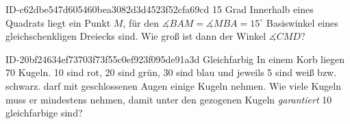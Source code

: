 \begin{exercise}
      {ID-c62dbe547d605460bea3082d3d4523f52cfa69cd}
      {15 Grad}
  \ifproblem\problem
    Innerhalb eines Quadrats liegt ein Punkt $M$, für den $\measuredangle
    BAM=\measuredangle MBA=15^{\circ}$ Basiswinkel eines gleichschenkligen
    Dreiecks sind. Wie groß ist dann der Winkel $\measuredangle CMD$?
    \begin{center}
    \end{center}
  \fi
\end{exercise}

\begin{exercise}
      {ID-20bf24634ef73703f73f55c0ef923f095de91a3d}
      {Gleichfarbig}
  \ifproblem\problem
    In einem Korb liegen 70 Kugeln. 10 sind rot, 20 sind grün, 30 sind blau
    und jeweils 5 sind weiß bzw. schwarz. \xya{} darf mit geschlossenen Augen
    einige Kugeln nehmen. Wie viele Kugeln muss er mindestens nehmen, damit
    unter den gezogenen Kugeln \emph{garantiert} 10 gleichfarbige sind?
  \fi
\end{exercise}

%

